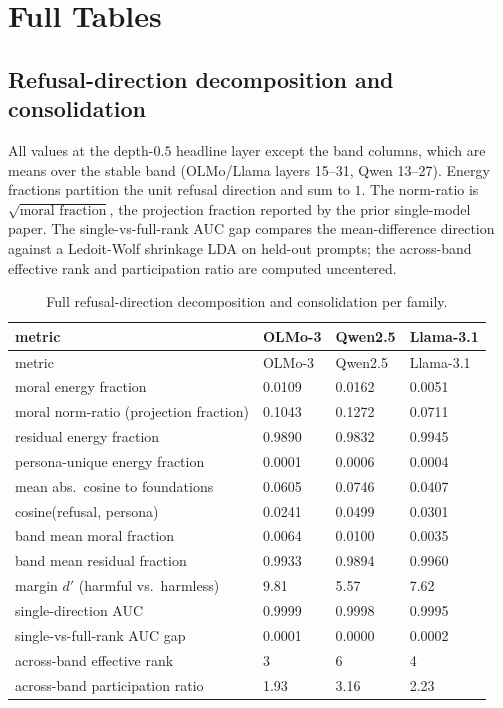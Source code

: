 \section{Full Tables}\label{appendix-a.-full-tables}

\subsection{Refusal-direction decomposition and consolidation}\label{a.1-refusal-direction-decomposition-and-consolidation}

All values at the depth-\(0.5\) headline layer except the band columns, which are
means over the stable band (OLMo/Llama layers 15--31, Qwen 13--27). Energy
fractions partition the unit refusal direction and sum to \(1\). The norm-ratio is
\(\sqrt{\text{moral fraction}}\), the projection fraction reported by the prior
single-model paper. The single-vs-full-rank AUC gap compares the mean-difference
direction against a Ledoit-Wolf shrinkage LDA on held-out prompts; the across-band
effective rank and participation ratio are computed uncentered.

\begin{longtable}[]{@{}llll@{}}
\caption{Full refusal-direction decomposition and consolidation per family.
\label{tab:a-decomp}}\tabularnewline
\toprule\noalign{}
metric & OLMo-3 & Qwen2.5 & Llama-3.1 \\
\midrule\noalign{}
\endfirsthead
\toprule\noalign{}
metric & OLMo-3 & Qwen2.5 & Llama-3.1 \\
\midrule\noalign{}
\endhead
\bottomrule\noalign{}
\endlastfoot
moral energy fraction & 0.0109 & 0.0162 & 0.0051 \\
moral norm-ratio (projection fraction) & 0.1043 & 0.1272 & 0.0711 \\
residual energy fraction & 0.9890 & 0.9832 & 0.9945 \\
persona-unique energy fraction & 0.0001 & 0.0006 & 0.0004 \\
mean abs.~cosine to foundations & 0.0605 & 0.0746 & 0.0407 \\
cosine(refusal, persona) & 0.0241 & 0.0499 & 0.0301 \\
band mean moral fraction & 0.0064 & 0.0100 & 0.0035 \\
band mean residual fraction & 0.9933 & 0.9894 & 0.9960 \\
margin \(d'\) (harmful vs.~harmless) & 9.81 & 5.57 & 7.62 \\
single-direction AUC & 0.9999 & 0.9998 & 0.9995 \\
single-vs-full-rank AUC gap & 0.0001 & 0.0000 & 0.0002 \\
across-band effective rank & 3 & 6 & 4 \\
across-band participation ratio & 1.93 & 3.16 & 2.23 \\
\end{longtable}

